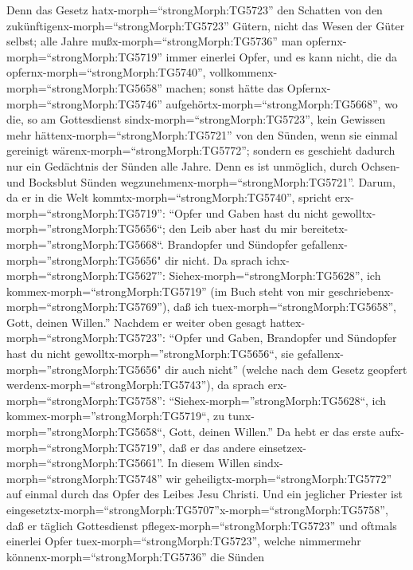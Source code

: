  Denn das Gesetz hatx-morph=``strongMorph:TG5723'' den
Schatten von den zukünftigenx-morph=``strongMorph:TG5723'' Gütern, nicht
das Wesen der Güter selbst; alle Jahre mußx-morph=``strongMorph:TG5736''
man opfernx-morph=``strongMorph:TG5719'' immer einerlei Opfer, und es
kann nicht, die da opfernx-morph=``strongMorph:TG5740'',
vollkommenx-morph=``strongMorph:TG5658'' machen;  sonst
hätte das Opfernx-morph=``strongMorph:TG5746''
aufgehörtx-morph=``strongMorph:TG5668'', wo die, so am Gottesdienst
sindx-morph=``strongMorph:TG5723'', kein Gewissen mehr
hättenx-morph=``strongMorph:TG5721'' von den Sünden, wenn sie einmal
gereinigt wärenx-morph=``strongMorph:TG5772'';  sondern es
geschieht dadurch nur ein Gedächtnis der Sünden alle Jahre. 
Denn es ist unmöglich, durch Ochsen-und Bocksblut Sünden
wegzunehmenx-morph=``strongMorph:TG5721''.  Darum, da er in
die Welt kommtx-morph=``strongMorph:TG5740'', spricht
erx-morph=``strongMorph:TG5719'': ``Opfer und Gaben hast du nicht
gewolltx-morph=''strongMorph:TG5656``; den Leib aber hast du mir
bereitetx-morph=''strongMorph:TG5668``.  Brandopfer und
Sündopfer gefallenx-morph=''strongMorph:TG5656" dir nicht. 
Da sprach ichx-morph=``strongMorph:TG5627'':
Siehex-morph=``strongMorph:TG5628'', ich
kommex-morph=``strongMorph:TG5719'' (im Buch steht von mir
geschriebenx-morph=``strongMorph:TG5769''), daß ich
tuex-morph=``strongMorph:TG5658'', Gott, deinen Willen.'' 
Nachdem er weiter oben gesagt hattex-morph=``strongMorph:TG5723'':
``Opfer und Gaben, Brandopfer und Sündopfer hast du nicht
gewolltx-morph=''strongMorph:TG5656``, sie
gefallenx-morph=''strongMorph:TG5656" dir auch nicht'' (welche nach dem
Gesetz geopfert werdenx-morph=``strongMorph:TG5743''),  da
sprach erx-morph=``strongMorph:TG5758'':
``Siehex-morph=''strongMorph:TG5628``, ich
kommex-morph=''strongMorph:TG5719``, zu
tunx-morph=''strongMorph:TG5658``, Gott, deinen Willen.'' Da hebt er das
erste aufx-morph=``strongMorph:TG5719'', daß er das andere
einsetzex-morph=``strongMorph:TG5661''.  In diesem Willen
sindx-morph=``strongMorph:TG5748'' wir
geheiligtx-morph=``strongMorph:TG5772'' auf einmal durch das Opfer des
Leibes Jesu Christi.  Und ein jeglicher Priester ist
eingesetztx-morph=``strongMorph:TG5707''\textbar x-morph=``strongMorph:TG5758'',
daß er täglich Gottesdienst pflegex-morph=``strongMorph:TG5723'' und
oftmals einerlei Opfer tuex-morph=``strongMorph:TG5723'', welche
nimmermehr könnenx-morph=``strongMorph:TG5736'' die Sünden

